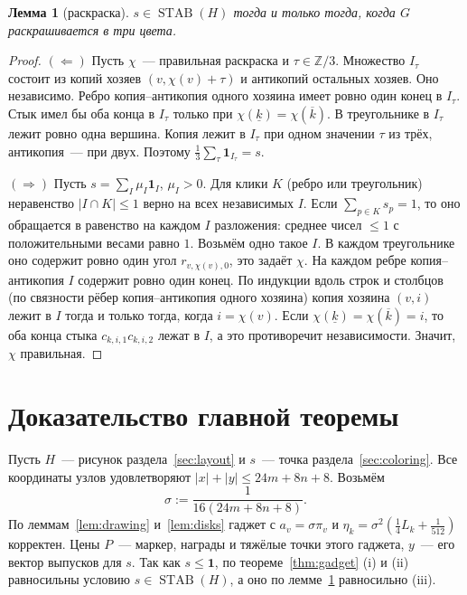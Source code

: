 \documentclass[a4paper,11pt]{article}
\theoremstyle{plain}
\newtheorem{lemma}[theorem]{Лемма}
\theoremstyle{definition}
\theoremstyle{remark}
\newcommand{\Z}{\mathbb{Z}}
\newcommand{\abs}[1]{\left\lvert #1 \right\rvert}
\DeclareMathOperator{\STAB}{STAB}
\begin{document}
\begin{lemma}[раскраска]\label{lem:coloring}
    $s\in\STAB(H)$ тогда и только тогда, когда $G$ раскрашивается в три цвета.
\end{lemma}

\begin{proof}
    $(\Leftarrow)$ Пусть $\chi$~--- правильная раскраска и $\tau\in\Z/3$. Множество $I_\tau$ состоит из копий хозяев $(v,\chi(v)+\tau)$ и антикопий остальных хозяев. Оно независимо. Ребро копия--антикопия одного хозяина имеет ровно один конец в $I_\tau$. Стык имел бы оба конца в $I_\tau$ только при $\chi(\underline k)=\chi(\overline k)$. В треугольнике в $I_\tau$ лежит ровно одна вершина. Копия лежит в $I_\tau$ при одном значении $\tau$ из трёх, антикопия~--- при двух. Поэтому $\frac13\sum_\tau\mathbf 1_{I_\tau}=s$.

    $(\Rightarrow)$ Пусть $s=\sum_I\mu_I\mathbf 1_I$, $\mu_I>0$. Для клики $K$ (ребро или треугольник) неравенство $\abs{I\cap K}\le1$ верно на всех независимых $I$. Если $\sum_{p\in K}s_p=1$, то оно обращается в равенство на каждом $I$ разложения: среднее чисел $\le1$ с положительными весами равно $1$. Возьмём одно такое $I$. В каждом треугольнике оно содержит ровно один угол $r_{v,\chi(v),0}$, это задаёт $\chi$. На каждом ребре копия--антикопия $I$ содержит ровно один конец. По индукции вдоль строк и столбцов (по связности рёбер копия--антикопия одного хозяина) копия хозяина $(v,i)$ лежит в $I$ тогда и только тогда, когда $i=\chi(v)$. Если $\chi(\underline k)=\chi(\overline k)=i$, то оба конца стыка $c_{k,i,1}c_{k,i,2}$ лежат в $I$, а это противоречит независимости. Значит, $\chi$ правильная.
\end{proof}

\section{Доказательство главной теоремы}

Пусть $H$~--- рисунок раздела~\ref{sec:layout} и $s$~--- точка раздела~\ref{sec:coloring}. Все координаты узлов удовлетворяют $\abs x+\abs y\le24m+8n+8$. Возьмём
\[
    \sigma:=\frac1{16(24m+8n+8)}.
\]
По леммам~\ref{lem:drawing} и~\ref{lem:disks} гаджет с $a_v=\sigma\pi_v$ и $\eta_k=\sigma^2(\frac14L_k+\frac1{512})$ корректен. Цены $P$~--- маркер, награды и тяжёлые точки этого гаджета, $y$~--- его вектор выпусков для $s$. Так как $s\le\mathbf 1$, по теореме~\ref{thm:gadget} (i) и (ii) равносильны условию $s\in\STAB(H)$, а оно по лемме~\ref{lem:coloring} равносильно (iii).
\end{document}
